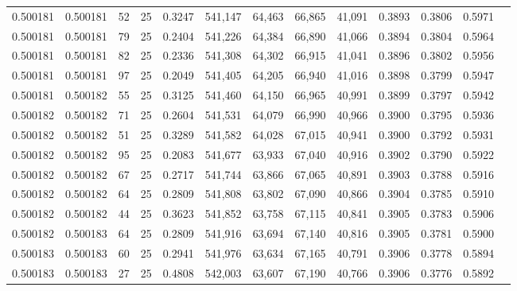 \begin{tabular}{rrrrrrrrrrrrr}
0.500181 & 0.500181 &    52 &  25 &                                     0.3247 & 541,147 &  64,463 &  66,865 &  41,091 & 0.3893 & 0.3806 & 0.5971 \\
0.500181 & 0.500181 &    79 &  25 &                                     0.2404 & 541,226 &  64,384 &  66,890 &  41,066 & 0.3894 & 0.3804 & 0.5964 \\
0.500181 & 0.500181 &    82 &  25 &                                     0.2336 & 541,308 &  64,302 &  66,915 &  41,041 & 0.3896 & 0.3802 & 0.5956 \\
0.500181 & 0.500181 &    97 &  25 &                                     0.2049 & 541,405 &  64,205 &  66,940 &  41,016 & 0.3898 & 0.3799 & 0.5947 \\
0.500181 & 0.500182 &    55 &  25 &                                     0.3125 & 541,460 &  64,150 &  66,965 &  40,991 & 0.3899 & 0.3797 & 0.5942 \\
0.500182 & 0.500182 &    71 &  25 &                                     0.2604 & 541,531 &  64,079 &  66,990 &  40,966 & 0.3900 & 0.3795 & 0.5936 \\
0.500182 & 0.500182 &    51 &  25 &                                     0.3289 & 541,582 &  64,028 &  67,015 &  40,941 & 0.3900 & 0.3792 & 0.5931 \\
0.500182 & 0.500182 &    95 &  25 &                                     0.2083 & 541,677 &  63,933 &  67,040 &  40,916 & 0.3902 & 0.3790 & 0.5922 \\
0.500182 & 0.500182 &    67 &  25 &                                     0.2717 & 541,744 &  63,866 &  67,065 &  40,891 & 0.3903 & 0.3788 & 0.5916 \\
0.500182 & 0.500182 &    64 &  25 &                                     0.2809 & 541,808 &  63,802 &  67,090 &  40,866 & 0.3904 & 0.3785 & 0.5910 \\
0.500182 & 0.500182 &    44 &  25 &                                     0.3623 & 541,852 &  63,758 &  67,115 &  40,841 & 0.3905 & 0.3783 & 0.5906 \\
0.500182 & 0.500183 &    64 &  25 &                                     0.2809 & 541,916 &  63,694 &  67,140 &  40,816 & 0.3905 & 0.3781 & 0.5900 \\
0.500183 & 0.500183 &    60 &  25 &                                     0.2941 & 541,976 &  63,634 &  67,165 &  40,791 & 0.3906 & 0.3778 & 0.5894 \\
0.500183 & 0.500183 &    27 &  25 &                                     0.4808 & 542,003 &  63,607 &  67,190 &  40,766 & 0.3906 & 0.3776 & 0.5892 \\

\end{tabular}
